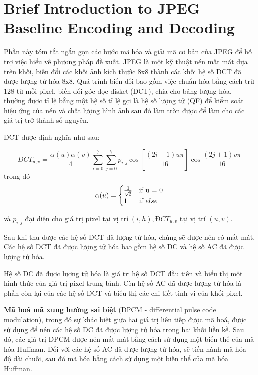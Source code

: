 \section{Brief Introduction to JPEG Baseline Encoding and Decoding}

Phần này tóm tắt ngắn gọn các bước mã hóa và giải mã cơ bản của JPEG để hỗ trợ việc hiểu về phương pháp đề xuất. JPEG là một kỹ thuật nén mất mát dựa trên khối, biến đổi các khối ảnh kích thước 8x8 thành các khối hệ số DCT đã được lượng tử hóa 8x8. Quá trình biến đổi bao gồm việc chuẩn hóa bằng cách trừ 128 từ mỗi pixel, biến đổi góc dọc disket (DCT), chia cho bảng lượng hóa, thường được tỉ lệ bằng một hệ số tỉ lệ gọi là hệ số lượng tử (QF) để kiểm soát hiệu ứng của nén và chất lượng hình ảnh sau đó làm tròn được để làm cho các giá trị trở thành số nguyên. 

DCT được định nghĩa như sau: 

\begin{equation}
\label{eq:chap2-DCT}
DCT_{u,v} = \frac{\alpha (u) \alpha (v)}{4} \sum _{i=0}^7 \sum_{j=0}^7 p_{i,j} \cos{[\frac{(2i + 1)u\pi}{16}]} \cos{ \frac{(2j + 1)v\pi}{16}}
\end{equation}
trong đó
\begin{equation}
\label{eq:chap2-DCT-condition}
\alpha(u) =
    \begin{cases}
        \frac{1}{\sqrt{2}} & $if u = 0$ \\
        1  & $if $ else 
    \end{cases}
\end{equation}

và $p_{i,j}$ đại diện cho giá trị pixel tại vị trí $(i,h), ĐCT_{u,v}$ tại vị trí $(u,v)$.

Sau khi thu được các hệ số DCT đã lượng tử hóa, chúng sẽ được nén có mất mát. Các hệ số DCT đã được lượng tử hóa bao gồm hệ số DC và hệ số AC đã được lượng tử hóa.  

Hệ số DC đã được lượng tử hóa là giá trị hệ số DCT đầu tiên và biểu thị một hình thức của giá trị pixel trung bình. Còn hệ số AC đã được lượng tử hóa là phần còn lại của các hệ số DCT và biểu thị các chi tiết tinh vi của khối pixel.


\textbf{Mã hoá mã xung hướng sai biệt} (DPCM - differential pulse code modulation), trong đó sự khác biệt giữa hai giá trị liên tiếp được mã hoá, được sử dụng để nén các hệ số DC đã được lượng tử hóa trong hai khối liền kề. Sau đó, các giá trị DPCM được nén mất mát bằng cách sử dụng một biến thể của mã hóa Huffman. Đối với các hệ số AC đã được lượng tử hóa, sẽ tiến hành mã hóa độ dài chuỗi, sau đó mã hóa bằng cách sử dụng một biến thể của mã hóa Huffman. 

